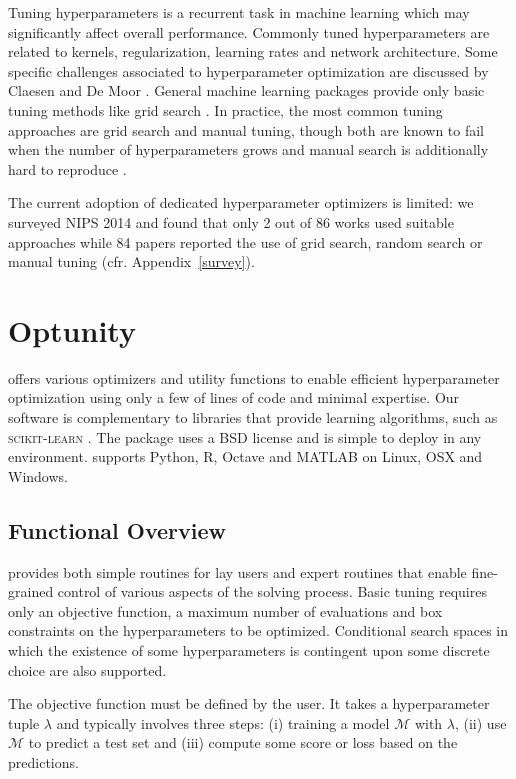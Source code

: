 Tuning hyperparameters is a recurrent task in machine learning which may significantly affect overall performance. Commonly tuned hyperparameters are related to kernels, regularization, learning rates and network architecture. Some specific challenges associated to hyperparameter optimization are discussed by Claesen and De Moor \citep{claesen2015hyperparameter}. General machine learning packages provide only basic tuning methods like grid search \citep{pedregosa2011scikit}. In practice, the most common tuning approaches are grid search and manual tuning, though both are known to fail when the number of hyperparameters grows and manual search is additionally hard to reproduce \citep{bergstra2012random}.

The current adoption of dedicated hyperparameter optimizers is limited: we surveyed NIPS 2014 and found that only 2 out of 86 works used suitable approaches while 84 papers reported the use of grid search, random search or manual tuning (cfr. Appendix~\ref{survey}).


\section{Optunity}
\optunity offers various optimizers and utility functions to enable efficient hyperparameter optimization using only a few of lines of code and minimal expertise. Our software is complementary to libraries that provide learning algorithms, such as \textsc{scikit-learn} \citep{pedregosa2011scikit}. The package uses a BSD license and is simple to deploy in any environment. \optunity supports Python, R, Octave and MATLAB on Linux, OSX and Windows.

\subsection{Functional Overview}
\optunity provides both simple routines for lay users and expert routines that enable fine-grained control of various aspects of the solving process. Basic tuning requires only an objective function, a maximum number of evaluations and box constraints on the hyperparameters to be optimized. Conditional search spaces in which the existence of some hyperparameters is contingent upon some discrete choice are also supported.

The objective function must be defined by the user. It takes a hyperparameter tuple $\lambda$ and typically involves three steps: (i) training a model $\mathcal{M}$ with $\lambda$, (ii) use $\mathcal{M}$ to predict a test set and (iii) compute some score or loss based on the predictions. %

